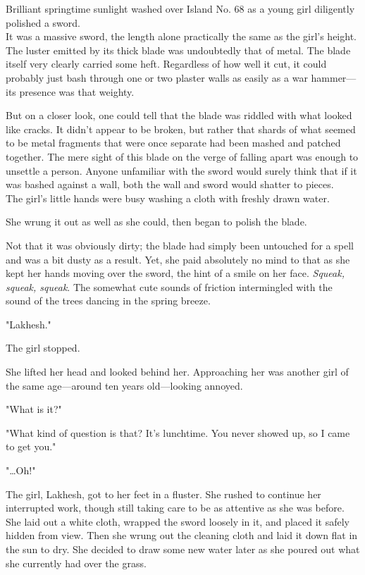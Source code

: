 Brilliant springtime sunlight washed over Island No. 68 as a young girl diligently polished a sword.
\\

It was a massive sword, the length alone practically the same as the girl's height. The luster emitted by its thick blade was undoubtedly that of metal. The blade itself very clearly carried some heft. Regardless of how well it cut, it could probably just bash through one or two plaster walls as easily as a war hammer—its presence was that weighty.

But on a closer look, one could tell that the blade was riddled with what looked like cracks. It didn't appear to be broken, but rather that shards of what seemed to be metal fragments that were once separate had been mashed and patched together. The mere sight of this blade on the verge of falling apart was enough to unsettle a person. Anyone unfamiliar with the sword would surely think that if it was bashed against a wall, both the wall and sword would shatter to pieces.
\\

The girl's little hands were busy washing a cloth with freshly drawn water.

She wrung it out as well as she could, then began to polish the blade.

Not that it was obviously dirty; the blade had simply been untouched for a spell and was a bit dusty as a result. Yet, she paid absolutely no mind to that as she kept her hands moving over the sword, the hint of a smile on her face. \textit{Squeak, squeak, squeak}. The somewhat cute sounds of friction intermingled with the sound of the trees dancing in the spring breeze.

"Lakhesh."

The girl stopped.

She lifted her head and looked behind her. Approaching her was another girl of the same age—around ten years old—looking annoyed.

"What is it?"

"What kind of question is that? It's lunchtime. You never showed up, so I came to get you."

"…Oh!"

The girl, Lakhesh, got to her feet in a fluster. She rushed to continue her interrupted work, though still taking care to be as attentive as she was before. She laid out a white cloth, wrapped the sword loosely in it, and placed it safely hidden from view. Then she wrung out the cleaning cloth and laid it down flat in the sun to dry. She decided to draw some new water later as she poured out what she currently had over the grass.


